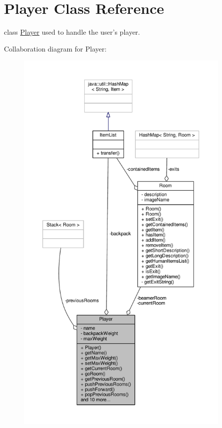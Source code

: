\hypertarget{classPlayer}{\section{Player Class Reference}
\label{classPlayer}
}


class \hyperlink{classPlayer}{Player} used to handle the user's player.  




Collaboration diagram for Player\-:
\nopagebreak
\begin{figure}[H]
\begin{center}
\leavevmode
\includegraphics[height=550pt]{classPlayer__coll__graph}
\end{center}
\end{figure}

